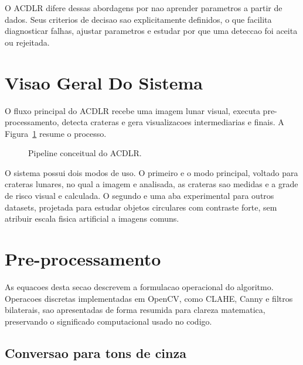 \documentclass[12pt,a4paper]{article}
\begin{document}
O ACDLR difere dessas abordagens por nao aprender parametros a partir de dados. Seus criterios de decisao sao explicitamente definidos, o que facilita diagnosticar falhas, ajustar parametros e estudar por que uma deteccao foi aceita ou rejeitada.

\section{Visao Geral Do Sistema}

O fluxo principal do ACDLR recebe uma imagem lunar visual, executa pre-processamento, detecta crateras e gera visualizacoes intermediarias e finais. A Figura~\ref{fig:pipeline} resume o processo.

\begin{figure}[H]
    \centering
    \caption{Pipeline conceitual do ACDLR.}
    \label{fig:pipeline}
\end{figure}

O sistema possui dois modos de uso. O primeiro e o modo principal, voltado para crateras lunares, no qual a imagem e analisada, as crateras sao medidas e a grade de risco visual e calculada. O segundo e uma aba experimental para outros datasets, projetada para estudar objetos circulares com contraste forte, sem atribuir escala fisica artificial a imagens comuns.

\section{Pre-processamento}

As equacoes desta secao descrevem a formulacao operacional do algoritmo. Operacoes discretas implementadas em OpenCV, como CLAHE, Canny e filtros bilaterais, sao apresentadas de forma resumida para clareza matematica, preservando o significado computacional usado no codigo.

\subsection{Conversao para tons de cinza}
\end{document}
